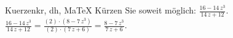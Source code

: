 \begin{MAufgabe}{Kuerzen}{kr, dh, MaTeX}
K\"urzen Sie soweit m\"oglich: $\frac{16 - 14\, z^3}{14\, z + 12}$.\\ 
\ifLsg\MLoesung
\quad $\frac{16 - 14\, z^3}{14\, z + 12}=\frac{(2)\cdot(8 - 7\, z^3)}{(2)\cdot(7\, z + 6)}=\frac{8 - 7\, z^3}{7\, z + 6}$.\else\relax\fi
 \end{MAufgabe}